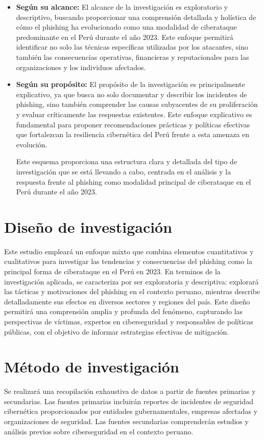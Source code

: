 \begin{itemize}
    \item \textbf{Según su alcance:}
    El alcance de la investigación es exploratorio y descriptivo, buscando proporcionar una comprensión detallada y holística de cómo el phishing ha evolucionado como una modalidad de ciberataque predominante en el Perú durante el año 2023. Este enfoque permitirá identificar no solo las técnicas específicas utilizadas por los atacantes, sino también las consecuencias operativas, financieras y reputacionales para las organizaciones y los individuos afectados.
    \item \textbf{Según su propósito:}
    El propósito de la investigación es principalmente explicativo, ya que busca no solo documentar y describir los incidentes de phishing, sino también comprender las causas subyacentes de su proliferación y evaluar críticamente las respuestas existentes. Este enfoque explicativo es fundamental para proponer recomendaciones prácticas y políticas efectivas que fortalezcan la resiliencia cibernética del Perú frente a esta amenaza en evolución.

Este esquema proporciona una estructura clara y detallada del tipo de investigación que se está llevando a cabo, centrada en el análisis y la respuesta frente al phishing como modalidad principal de ciberataque en el Perú durante el año 2023.
\end{itemize}
\section{Diseño de investigación}
Este estudio empleará un enfoque mixto que combina elementos 
cuantitativos y cualitativos para investigar las tendencias 
y consecuencias del phishing como la principal forma de 
ciberataque en el Perú en 2023. En terminos de la investigación aplicada, se 
caracteriza por ser exploratoria y descriptiva: explorará 
las tácticas y motivaciones del phishing en el contexto 
peruano, mientras describe detalladamente sus efectos en 
diversos sectores y regiones del país. Este diseño permitirá 
una comprensión amplia y profunda del fenómeno, capturando 
las perspectivas de víctimas, expertos en ciberseguridad y 
responsables de políticas públicas, con el objetivo de 
informar estrategias efectivas de mitigación.
\section{Método de investigación}
Se realizará una recopilación exhaustiva de datos a partir de fuentes primarias y secundarias. Las fuentes primarias incluirán reportes de incidentes de seguridad cibernética proporcionados por entidades gubernamentales, empresas afectadas y organizaciones de seguridad. Las fuentes secundarias comprenderán estudios y análisis previos sobre ciberseguridad en el contexto peruano.

